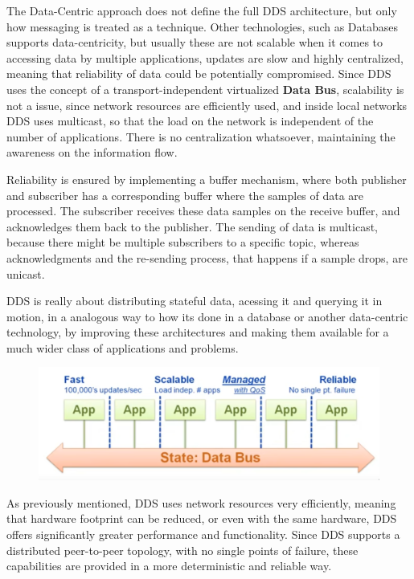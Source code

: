 The Data-Centric approach does not define the full DDS architecture, but only how messaging is treated as a technique. Other technologies, such as Databases supports data-centricity, but usually these are not scalable when it comes to accessing data by multiple applications, updates are slow and highly centralized, meaning that reliability of data could be potentially compromised. Since DDS uses the concept of a transport-independent virtualized \textbf{Data Bus}, scalability is not a issue, since network resources are efficiently used, and inside local networks DDS uses multicast, so that the load on the network is independent of the number of applications. There is no centralization whatsoever, maintaining the awareness on the information flow. 
                
Reliability is ensured by implementing a buffer mechanism, where both publisher and subscriber has a corresponding buffer where the samples of data are processed. The subscriber receives these data samples on the receive buffer, and acknowledges them back to the publisher. The sending of data is multicast, because there might be multiple subscribers to a specific topic, whereas acknowledgments and the re-sending process, that happens if a sample drops, are unicast. 
                
DDS is really about distributing stateful data, acessing it and querying it in motion, in a analogous way to how its done in a database or another data-centric technology, by improving these architectures and making them available for a much wider class of applications and problems.  
                
\begin{figure}[H]
    \centering
    \includegraphics[width=0.5\linewidth]{images/dds-architecture.png}
\end{figure}

As previously mentioned, DDS uses network resources very efficiently, meaning that hardware footprint can be reduced, or even with the same hardware, DDS offers significantly greater performance and functionality. Since DDS supports a distributed peer-to-peer topology, with no single points of failure, these capabilities are provided in a more deterministic and reliable way.


